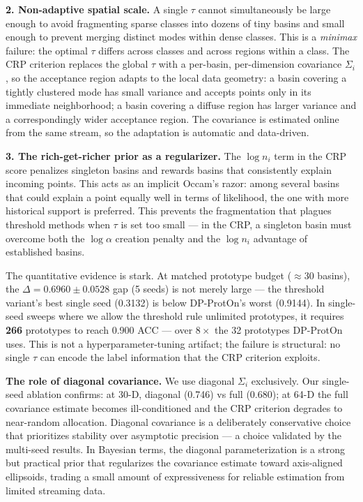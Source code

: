 \documentclass[11pt,a4paper]{article}
\begin{document}
\textbf{2. Non-adaptive spatial scale.} A single $\tau$ cannot simultaneously be large enough to avoid fragmenting sparse classes into dozens of tiny basins and small enough to prevent merging distinct modes within dense classes. This is a \textit{minimax} failure: the optimal $\tau$ differs across classes and across regions within a class. The CRP criterion replaces the global $\tau$ with a per-basin, per-dimension covariance $\Sigma_i$, so the acceptance region adapts to the local data geometry: a basin covering a tightly clustered mode has small variance and accepts points only in its immediate neighborhood; a basin covering a diffuse region has larger variance and a correspondingly wider acceptance region. The covariance is estimated online from the same stream, so the adaptation is automatic and data-driven.

\textbf{3. The rich-get-richer prior as a regularizer.} The $\log n_i$ term in the CRP score penalizes singleton basins and rewards basins that consistently explain incoming points. This acts as an implicit Occam's razor: among several basins that could explain a point equally well in terms of likelihood, the one with more historical support is preferred. This prevents the fragmentation that plagues threshold methods when $\tau$ is set too small --- in the CRP, a singleton basin must overcome both the $\log\alpha$ creation penalty and the $\log n_i$ advantage of established basins.

The quantitative evidence is stark. At matched prototype budget ($\approx$30 basins), the $\Delta = 0.6960\pm0.0528$ gap (5 seeds) is not merely large --- the threshold variant's best single seed (0.3132) is below DP-ProtOn's worst (0.9144). In single-seed sweeps where we allow the threshold rule unlimited prototypes, it requires \textbf{266} prototypes to reach 0.900 ACC --- over $8\times$ the 32 prototypes DP-ProtOn uses. This is not a hyperparameter-tuning artifact; the failure is structural: no single $\tau$ can encode the label information that the CRP criterion exploits.

\textbf{The role of diagonal covariance.} We use diagonal $\Sigma_i$ exclusively. Our single-seed ablation confirms: at 30-D, diagonal (0.746) vs full (0.680); at 64-D the full covariance estimate becomes ill-conditioned and the CRP criterion degrades to near-random allocation. Diagonal covariance is a deliberately conservative choice that prioritizes stability over asymptotic precision --- a choice validated by the multi-seed results. In Bayesian terms, the diagonal parameterization is a strong but practical prior that regularizes the covariance estimate toward axis-aligned ellipsoids, trading a small amount of expressiveness for reliable estimation from limited streaming data.
\end{document}

